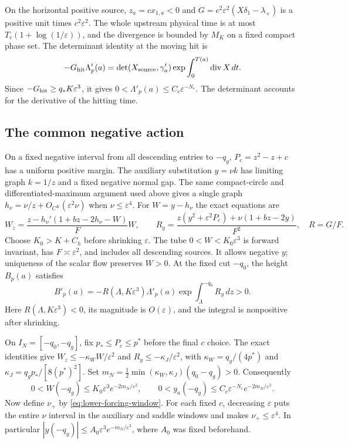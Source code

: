 On the horizontal positive source,
$z_a=cx_{1,a}<0$ and
$G=c^2\varepsilon^2(X\delta_1-\lambda_+)$ is a positive
unit times $c^2\varepsilon^2$.
The whole upstream physical time is at most
$T_c(1+\log(1/\varepsilon))$, and the divergence is bounded by
$M_K$ on a fixed compact phase set.
The determinant identity at the moving hit is
\begin{equation}\label{eq:realizing-descent-jacobian}
 -G_{\rm hit}\Lambda'_p(a)
  =\det(X_{\rm source},\gamma'_a)
                   \exp\int_0^{T(a)}\operatorname{div}X\,dt .
\end{equation}
Since $-G_{\rm hit}\ge q_*K\varepsilon^3$, it gives
$0<\Lambda'_p(a)\le C_c\varepsilon^{-N_c}$.
The determinant accounts for the derivative of the hitting time.

\subsection{The common negative action}
On a fixed negative interval from all descending entries to
$-q_g$, $P_c=z^2-z+c$ has a uniform positive margin.
The auxiliary substitution $y=\nu k$ has limiting graph
$k=1/z$ and a fixed negative normal gap.
The same compact-circle and differentiated-maximum argument
used above gives a single graph
$h_\nu=\nu/z+O_{C^K}(\varepsilon^2\nu)$ when
$\nu\le\varepsilon^4$.
For $W=y-h_\nu$ the exact equations are
\begin{equation}\label{eq:realizing-negative-identities}
 W_z=\frac{z-h_\nu'(1+bz-2h_\nu-W)}F W,\qquad
 R_y=\frac{z(y^2+\varepsilon^2P_c)+
                     \nu(1+bz-2y)}{F^2},\quad R=G/F .
\end{equation}
Choose $K_0>K+C_h$ before shrinking $\varepsilon$.
The tube $0<W<K_0\varepsilon^3$ is forward invariant,
has $F\asymp\varepsilon^2$, and includes all descending sources.
It allows negative $y$; uniqueness of the scalar flow preserves $W>0$.
At the fixed cut $-q_0$, the height $B_p(a)$ satisfies
\[
 B'_p(a)=-R(\Lambda,K\varepsilon^3)\Lambda'_p(a)
                       \exp\int_\Lambda^{-q_0}R_y\,dz>0 .
\]
Here $R(\Lambda,K\varepsilon^3)<0$, its magnitude is $O(\varepsilon)$,
and the integral is nonpositive after shrinking.

On $I_N=[-q_0,-q_g]$, fix $p_*\le P_c\le p^*$ before the final
$c$ choice. The exact identities give
$W_z\le-\kappa_WW/\varepsilon^2$ and
$R_y\le-\kappa_J/\varepsilon^2$, with
$\kappa_W=q_g/(4p^*)$ and
$\kappa_J=q_gp_*/[8(p^*)^2]$.
Set
$m_N=\frac12\min(\kappa_W,\kappa_J)(q_0-q_g)>0$.
Consequently
\begin{equation}\label{eq:realizing-negative-action}
 0<W(-q_g)\le K_0\varepsilon^3e^{-2m_N/\varepsilon^2},
 \qquad
 0<y_a(-q_g)\le C_c\varepsilon^{-N_c}e^{-2m_N/\varepsilon^2}.
\end{equation}
Now define $\nu_+$ by \eqref{eq:lower-forcing-window}.
For each fixed $c$, decreasing $\varepsilon$ puts the entire
$\nu$ interval in the auxiliary and saddle windows and makes
$\nu_+\le\varepsilon^4$. In particular
$|y(-q_g)|\le A_0\varepsilon^3e^{-m_N/\varepsilon^2}$,
where $A_0$ was fixed beforehand.

